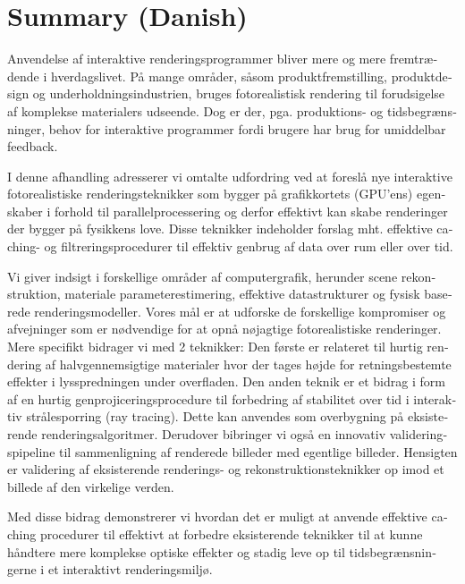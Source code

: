 \chapter{Summary (Danish)}
\begin{otherlanguage}{danish}
Anvendelse af interaktive renderingsprogrammer bliver mere og mere fremtrædende i hverdagslivet. På mange områder, såsom produktfremstilling, produktdesign og underholdningsindustrien, bruges fotorealistisk rendering til forudsigelse af komplekse materialers udseende. Dog er der, pga. produktions- og tidsbegrænsninger, behov for interaktive programmer fordi brugere har brug for umiddelbar feedback.

I denne afhandling adresserer vi omtalte udfordring ved at foreslå nye interaktive fotorealistiske renderingsteknikker som bygger på grafikkortets (GPU’ens) egenskaber i forhold til parallelprocessering og derfor effektivt kan skabe renderinger der bygger på fysikkens love. Disse teknikker indeholder forslag mht. effektive caching- og filtreringsprocedurer til effektiv genbrug af data over rum eller over tid.

Vi giver indsigt i forskellige områder af computergrafik, herunder scene rekonstruktion, materiale parameterestimering, effektive datastrukturer og fysisk baserede renderingsmodeller. Vores mål er at udforske de forskellige kompromiser og afvejninger som er nødvendige for at opnå nøjagtige fotorealistiske renderinger. Mere specifikt bidrager vi med 2 teknikker: Den første er relateret til hurtig rendering af halvgennemsigtige materialer hvor der tages højde for retningsbestemte effekter i lysspredningen under overfladen. Den anden teknik er et bidrag i form af en hurtig genprojiceringsprocedure til forbedring af stabilitet over tid i interaktiv strålesporring (ray tracing). Dette kan anvendes som overbygning på eksisterende renderingsalgoritmer. Derudover bibringer vi også en innovativ valideringspipeline til sammenligning af renderede billeder med egentlige billeder. Hensigten er validering af eksisterende renderings- og rekonstruktionsteknikker op imod et billede af den virkelige verden.

Med disse bidrag demonstrerer vi hvordan det er muligt at anvende effektive caching procedurer til effektivt at forbedre eksisterende teknikker til at kunne håndtere mere komplekse optiske effekter og stadig leve op til tidsbegrænsningerne i et interaktivt renderingsmiljø.
\end{otherlanguage}